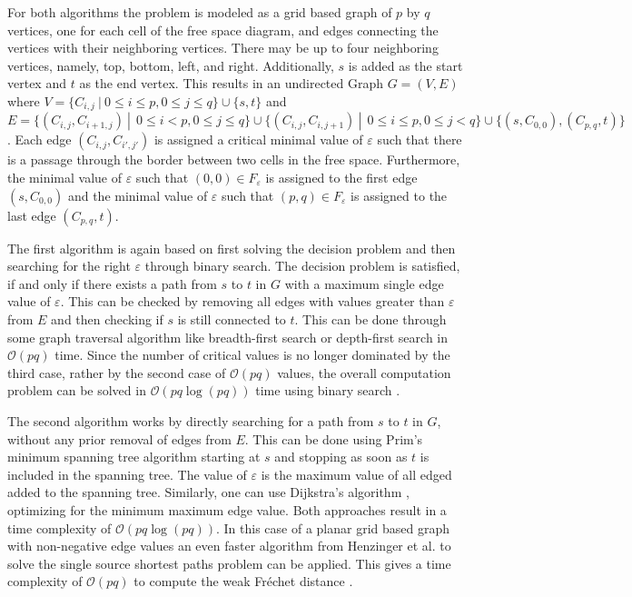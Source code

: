 \documentclass[
oneside,
fontsize=11pt
]{scrartcl}
\begin{document}
For both algorithms the problem is modeled as a grid based graph of $p$ by $q$ vertices, 
one for each cell of the free space diagram,
and edges connecting the vertices with their neighboring vertices.
There may be up to four neighboring vertices, namely, 
top, bottom, left, and right.
Additionally, $s$ is added as the start vertex and $t$ as the end vertex.
This results in an undirected Graph $G=(V,E)$ 
where $V = \{C_{i,j} \ | \ 0 \leq i \leq p, 0 \leq j \leq q \} \cup \{s,t\}$
and $E=\{(C_{i,j}, C_{i+1,j}) \ | \ \ 0 \leq i < p, 0 \leq j \leq q\} \cup \{(C_{i,j}, C_{i,j+1}) \ | \ \ 0 \leq i \leq p, 0 \leq j < q\} \cup \{(s, C_{0,0}), (C_{p,q}, t)\}$.
Each edge $(C_{i,j}, C_{i',j'})$ is assigned a critical minimal value of $\varepsilon$ 
such that there is a passage through the border between two cells in the free space. 
Furthermore, the minimal value of $\varepsilon$ such that $(0,0) \in F_\varepsilon$ is assigned to the first edge $(s, C_{0,0})$ 
and the minimal value of $\varepsilon$ such that $(p,q) \in F_\varepsilon$ is assigned to the last edge $(C_{p,q}, t)$. \cite{alt_computing_1995}

The first algorithm is again based on first solving the decision problem 
and then searching for the right $\varepsilon$ through binary search.
The decision problem is satisfied, if and only if there exists a path from $s$ to $t$ in $G$ 
with a maximum single edge value of $\varepsilon$.
This can be checked by removing all edges with values greater than $\varepsilon$ from $E$ 
and then checking if $s$ is still connected to $t$. 
This can be done through some graph traversal algorithm like breadth-first search or depth-first search
in $\mathcal{O}(pq)$ time. \cite{alt_computing_1995}
Since the number of critical values is no longer dominated by the third case,
rather by the second case of $\mathcal{O}(pq)$ values, 
the overall computation problem can be solved in $\mathcal{O}(pq \log (pq))$ time using binary search \cite{van_leusden_novel_2013}. 

The second algorithm works by directly searching for a path from $s$ to $t$ in $G$,
without any prior removal of edges from $E$.
This can be done using Prim's minimum spanning tree algorithm \cite{prim_shortest_1957} starting at $s$ 
and stopping as soon as $t$ is included in the spanning tree. 
The value of $\varepsilon$ is the maximum value of all edged added to the spanning tree.
Similarly, one can use Dijkstra's algorithm \cite{dijkstra_note_1959}, 
optimizing for the minimum maximum edge value.
Both approaches result in a time complexity of $\mathcal{O}(pq \log (pq))$. \cite{alt_computing_1995}
In this case of a planar grid based graph with non-negative edge values 
an even faster algorithm from Henzinger et al. \cite{henzinger_faster_1997} to solve the single source shortest paths problem 
can be applied. This gives a time complexity of $\mathcal{O}(pq)$ to compute the weak Fréchet distance \cite{van_leusden_novel_2013}.
\end{document}
